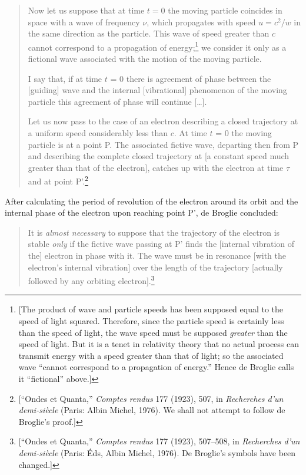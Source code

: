 \begin{quotation}
Now let us suppose that at time $t = 0$ the moving particle
coincides in space with a wave of frequency $\nu$, which propagates
with speed $u = c^2/w$ in the same direction as the
particle. This wave of speed greater than $c$ cannot correspond to
a propagation of energy;\footnote{{[}The product of wave and particle
  speeds has been supposed equal to the speed of light squared.
  Therefore, since the particle speed is certainly less than the speed
  of light, the wave speed must be supposed \emph{greater} than the
  speed of light. But it is a tenet in relativity theory that no actual
  process can transmit energy with a speed greater than that of light;
  so the associated wave ``cannot correspond to a propagation of
  energy.'' Hence de Broglie calls it ``fictional'' above.{]}} we
consider it only as a fictional wave associated with the motion of the
moving particle.

I say that, if at time $t$ = 0 there is agreement of phase between
the {[}guiding{]} wave and the internal {[}vibrational{]} phenomenon of
the moving particle this agreement of phase will continue [\ldots].

Let us now pass to the case of an electron describing a closed
trajectory at a uniform speed considerably less than $c$. At time
$t$ = 0 the moving particle is at a point P. The associated fictive
wave, departing then from P and describing the complete closed
trajectory at {[}a constant speed much greater than that of the
electron{]}, catches up with the electron at time $\tau$ and at point
P'.\footnote{{[}``Ondes et Quanta,'' \emph{Comptes rendus} 177
  (1923), 507, in \emph{Recherches d'un demi-siècle} (Paris: Albin
  Michel, 1976). We shall not attempt to follow de Broglie's proof.{]}}
\end{quotation}

After calculating the period of revolution of the electron around its
orbit and the internal phase of the electron upon reaching point P', de
Broglie concluded:

\begin{quote}
It is \emph{almost necessary} to suppose that the trajectory of the
electron is stable \emph{only} if the fictive wave passing at P' finds
the {[}internal vibration of the{]} electron in phase with it. The wave
must be in resonance {[}with the electron's internal vibration{]} over
the length of the trajectory {[}actually followed by any orbiting
electron{]}.\footnote{{[}``Ondes et Quanta,'' \emph{Comptes
  rendus} 177 (1923), 507--508, in \emph{Recherches d'un demi-siècle}
  (Paris: Éds, Albin Michel, 1976). De Broglie's symbols have been
  changed.{]}}
\end{quote}

